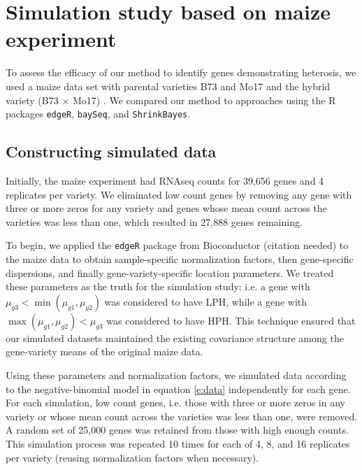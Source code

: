 \documentclass[useAMS,usenatbib,referee]{biom}
\begin{document}
\section{Simulation study based on maize experiment}
\label{s:simulation}

% 

To assess the efficacy of our method to identify genes demonstrating heterosis, we used a maize data set with parental varieties B73 and Mo17 and the hybrid variety (B73 $\times$ Mo17) \citep{paschold2012complementation}. We compared our method to approaches using the R packages {\tt edgeR}, {\tt baySeq}, and {\tt ShrinkBayes}.

\subsection{Constructing simulated data}
\label{s:sim_data}

Initially, the maize experiment had RNAseq counts for 39,656 genes and 4 replicates per variety. We eliminated low count genes by removing any gene with three or more zeros for any variety and genes whose mean count across the varieties was less than one, which resulted in 27,888 genes remaining.

To begin, we applied the {\tt edgeR} package from Bioconductor (citation needed) to the maize data to obtain sample-specific normalization factors, then gene-specific dispersions, and finally gene-variety-specific location parameters. We treated these parameters as the truth for the simulation study: i.e. a gene with $\mu_{g3} < \min(\mu_{g1}, \mu_{g2})$ was considered to have LPH, while a gene with $\max(\mu_{g1},\mu_{g2}) < \mu_{g3}$ was considered to have HPH. This technique ensured that our simulated datasets maintained the existing covariance structure among the gene-variety means of the original maize data.

Using these parameters and normalization factors, we simulated data according to the negative-binomial model in equation \eqref{e:data} independently for each gene. For each simulation, low count genes, i.e. those with three or more zeros in any variety or whose mean count across the varieties was less than one, were removed. A random set of 25,000 genes was retained from those with high enough counts. This simulation process was repeated 10 times for each of 4, 8, and 16 replicates per variety (reusing normalization factors when necessary).
\end{document}
